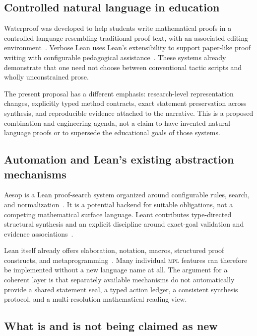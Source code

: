 \documentclass[11pt,a4paper]{article}
\newcommand{\MPL}{\textnormal{\textsc{mpl}}}
\theoremstyle{remark}
\begin{document}
\subsection{Controlled natural language in education}

Waterproof was developed to help students write mathematical proofs in a controlled language resembling traditional proof text, with an associated editing environment~\cite{waterproof}. Verbose Lean uses Lean's extensibility to support paper-like proof writing with configurable pedagogical assistance~\cite{verbose}. These systems already demonstrate that one need not choose between conventional tactic scripts and wholly unconstrained prose.

The present proposal has a different emphasis: research-level representation changes, explicitly typed method contracts, exact statement preservation across synthesis, and reproducible evidence attached to the narrative. This is a proposed combination and engineering agenda, not a claim to have invented natural-language proofs or to supersede the educational goals of those systems.

\subsection{Automation and Lean's existing abstraction mechanisms}

Aesop is a Lean proof-search system organized around configurable rules, search, and normalization~\cite{aesop}. It is a potential backend for suitable obligations, not a competing mathematical surface language. Leant contributes type-directed structural synthesis and an explicit discipline around exact-goal validation and evidence associations~\cite{leant-readme,leant-internals}.

Lean itself already offers elaboration, notation, macros, structured proof constructs, and metaprogramming~\cite{lean-elaboration}. Many individual \MPL{} features can therefore be implemented without a new language name at all. The argument for a coherent layer is that separately available mechanisms do not automatically provide a shared statement seal, a typed action ledger, a consistent synthesis protocol, and a multi-resolution mathematical reading view.

\subsection{What is and is not being claimed as new}
\end{document}
